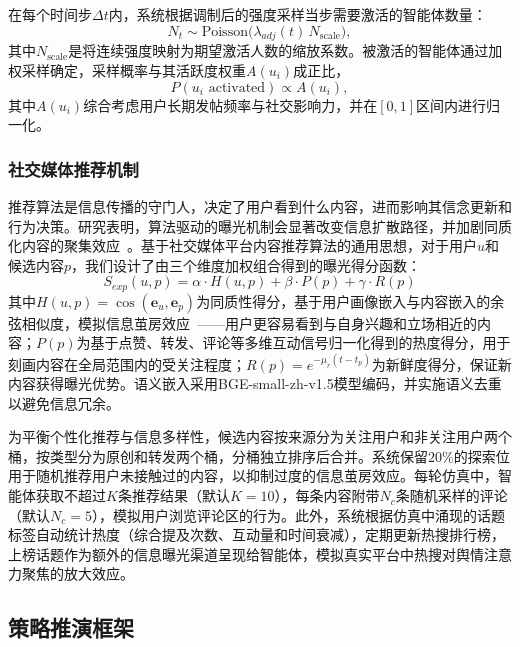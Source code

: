 \documentclass[lettersize,journal]{IEEEtran}
\begin{document}
在每个时间步$\Delta t$内，系统根据调制后的强度采样当步需要激活的智能体数量：
\begin{equation}
N_t \sim \text{Poisson}\!\bigl(\lambda_{adj}(t)\, N_{\text{scale}}\bigr),
\end{equation}
其中$N_{\text{scale}}$是将连续强度映射为期望激活人数的缩放系数。被激活的智能体通过加权采样确定，采样概率与其活跃度权重$A(u_i)$成正比，
\begin{equation}
P(u_i \text{ activated}) \propto A(u_i),
\end{equation}
其中$A(u_i)$综合考虑用户长期发帖频率与社交影响力，并在$[0,1]$区间内进行归一化。

\subsubsection{社交媒体推荐机制}

推荐算法是信息传播的守门人，决定了用户看到什么内容，进而影响其信念更新和行为决策。研究表明，算法驱动的曝光机制会显著改变信息扩散路径，并加剧同质化内容的聚集效应~\cite{wu2023algorithmic_exposure}。基于社交媒体平台内容推荐算法的通用思想，对于用户$u$和候选内容$p$，我们设计了由三个维度加权组合得到的曝光得分函数：
\begin{equation}
S_{exp}(u, p) = \alpha \cdot H(u, p) + \beta \cdot P(p) + \gamma \cdot R(p)
\label{eq:recommend}
\end{equation}
其中$H(u, p) = \cos(\mathbf{e}_u, \mathbf{e}_p)$为同质性得分，基于用户画像嵌入与内容嵌入的余弦相似度，模拟信息茧房效应~\cite{cinelli_echo_2021}——用户更容易看到与自身兴趣和立场相近的内容；$P(p)$为基于点赞、转发、评论等多维互动信号归一化得到的热度得分，用于刻画内容在全局范围内的受关注程度；$R(p) = e^{-\mu_r(t - t_p)}$为新鲜度得分，保证新内容获得曝光优势。语义嵌入采用BGE-small-zh-v1.5模型编码，并实施语义去重以避免信息冗余。

为平衡个性化推荐与信息多样性，候选内容按来源分为关注用户和非关注用户两个桶，按类型分为原创和转发两个桶，分桶独立排序后合并。系统保留$20\%$的探索位用于随机推荐用户未接触过的内容，以抑制过度的信息茧房效应。每轮仿真中，智能体获取不超过$K$条推荐结果（默认$K{=}10$），每条内容附带$N_c$条随机采样的评论（默认$N_c{=}5$），模拟用户浏览评论区的行为。此外，系统根据仿真中涌现的话题标签自动统计热度（综合提及次数、互动量和时间衰减），定期更新热搜排行榜，上榜话题作为额外的信息曝光渠道呈现给智能体，模拟真实平台中热搜对舆情注意力聚焦的放大效应。

\subsection{策略推演框架}
\label{subsec:strategy}
\end{document}
